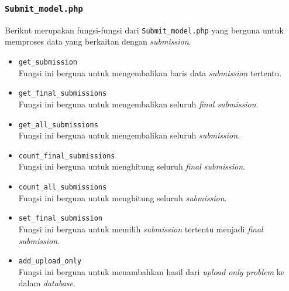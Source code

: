 \subsubsection{\texttt{Submit\_model.php}}
Berikut merupakan fungsi-fungsi dari \texttt{Submit\_model.php} yang berguna untuk memproses data yang berkaitan dengan \textit{submission}.
\begin{itemize}
	\item \texttt{get\_submission}\\
	Fungsi ini berguna untuk mengembalikan baris data \textit{submission} tertentu.
	\item \texttt{get\_final\_submissions}\\
	Fungsi ini berguna untuk mengembalikan seluruh \textit{final submission}.
	\item \texttt{get\_all\_submissions}\\
	Fungsi ini berguna untuk mengembalikan seluruh \textit{submission}.
	\item \texttt{count\_final\_submissions}\\
	Fungsi ini berguna untuk menghitung seluruh \textit{final submission}.
	\item \texttt{count\_all\_submissions}\\
	Fungsi ini berguna untuk menghitung seluruh \textit{submission}.
	\item \texttt{set\_final\_submission}\\
	Fungsi ini berguna untuk memilih \textit{submission} tertentu menjadi \textit{final submission}.
	\item \texttt{add\_upload\_only}\\
	Fungsi ini berguna untuk menambahkan hasil dari \textit{upload only problem} ke dalam \textit{database}.
\end{itemize}

